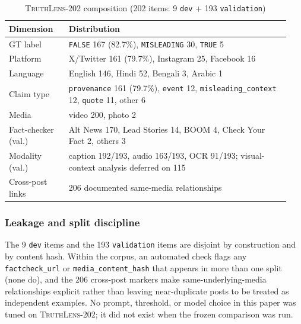 \documentclass[conference]{IEEEtran}
\begin{document}
\begin{table}[!t]
\caption{\textsc{TruthLens-202} composition (202 items: 9 \texttt{dev} + 193 \texttt{validation})}
\label{tab:tl202}
\centering
\footnotesize
\setlength{\tabcolsep}{3pt}
\begin{tabular}{@{}p{0.20\linewidth}p{0.74\linewidth}@{}}
\toprule
Dimension & Distribution \\
\midrule
GT label & \texttt{FALSE} 167 (82.7\%), \texttt{MISLEADING} 30, \texttt{TRUE} 5 \\
Platform & X/Twitter 161 (79.7\%), Instagram 25, Facebook 16 \\
Language & English 146, Hindi 52, Bengali 3, Arabic 1 \\
Claim type & \texttt{provenance} 161 (79.7\%), \texttt{event} 12, \texttt{misleading\_context} 12, \texttt{quote} 11, other 6 \\
Media & video 200, photo 2 \\
Fact-checker (val.) & Alt News 170, Lead Stories 14, BOOM 4, Check Your Fact 2, others 3 \\
Modality (val.) & caption 192/193, audio 163/193, OCR 91/193; visual-context analysis deferred on 115 \\
Cross-post links & 206 documented same-media relationships \\
\bottomrule
\end{tabular}
\end{table}

\subsubsection{Leakage and split discipline}
The 9 \texttt{dev} items and the 193 \texttt{validation} items are
disjoint by construction and by content hash. Within the corpus, an
automated check flags any \texttt{factcheck\_url} or
\texttt{media\_content\_hash} that appears in more than one split (none
do), and the 206 cross-post markers make same-underlying-media
relationships explicit rather than leaving near-duplicate posts to be
treated as independent examples. No prompt, threshold, or model choice
in this paper was tuned on \textsc{TruthLens-202}; it did not exist when
the frozen comparison was run.
\end{document}

